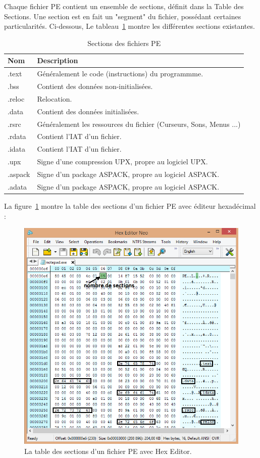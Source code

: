 Chaque fichier PE contient un ensemble de sections, définit dans la Table des Sections. Une section est en fait un "segment" du fichier, possédant certaines particularités. Ci-dessous, Le tableau~\ref{tab4} montre
les différentes sections existantes.
\begin{table}[H]
\begin{tabular}{|p{2 cm}|p{12 cm}|}
\hline \textbf{Nom} &  \textbf{Description}\\
\hline .text & Généralement le code (instructions) du programmme.\\
\hline .bss & Contient des données non-initialisées.\\
\hline .reloc & Relocation.\\
\hline .data & Contient des données initialisées.\\
\hline .rsrc & Généralement les ressources du fichier (Curseurs, Sons, Menus ...)\\
\hline .rdata & Contient l'IAT d'un fichier.\\
\hline .idata & Contient l'IAT d'un fichier.\\
\hline .upx & Signe d'une compression UPX, propre au logiciel UPX.\\
\hline .aspack & Signe d'un package ASPACK, propre au logiciel ASPACK.\\
\hline .adata & Signe d'un package ASPACK, propre au logiciel ASPACK.\\
\hline
\end{tabular}
\caption{ Sections des fichiers PE}
\label{tab4}
\end{table}
La figure~\ref{fig :pic5} montre la table des sections d'un fichier PE avec éditeur hexadécimal :
\begin{figure}[H]
\begin{center}
\includegraphics[scale=0.8]{Figures/pic5.PNG}
\caption{ La table des sections d'un fichier PE avec Hex Editor.}
\label{fig :pic5} 
\end{center}
\end{figure} 
